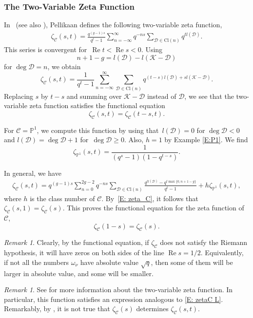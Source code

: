 \documentclass{amsart}
\renewcommand\Re{\operatorname*{Re}}	\renewcommand\Im{\operatorname*{Im}}
\renewcommand\P{\mathbb{P}}
\newcommand\Curve{\mathcal{C}}
\newcommand\calD{\mathcal{D}}	\newcommand\calK{\mathcal{K}}
\newcommand\Pic{\mathrm{Cl}}
\theoremstyle{definition}\newtheorem{definition}[theorem]{Definition}
\theoremstyle{remark}\newtheorem{remark}[theorem]{Remark}
\numberwithin{equation}{section}
\begin{document}
\subsubsection{The Two-Variable Zeta Function}
\label{S:two-variable}

In~\cite{Pell} (see also \cite{Expositiones}),
Pellikaan defines the following two-variable zeta function,
\begin{gather*}
\zeta_\Curve(s,t)=\frac{q^{(g-1)s}}{q^t-1}\sum_{n=-\infty}^\infty q^{-ns}\sum_{\calD\in\Pic(n)}q^{tl(\calD)}.
\end{gather*}
This series is convergent for~\mbox{$\Re t<\Re s<0$}.
Using
$$
n+1-g=l(\calD)-l(\calK-\calD)
$$
 for $\deg\calD=n$,
we obtain
$$
\zeta_\Curve(s,t)=\frac{1}{q^t-1}\sum_{n=-\infty}^\infty\sum_{\calD\in\Pic(n)}q^{(t-s)l(\calD)+sl(\calK-\calD)}.
$$
Replacing $s$ by $t-s$ and summing over $\calK-\calD$ instead of $\calD$,
we see that the two-variable zeta function satisfies the functional equation
$$
\zeta_\Curve(s,t)=\zeta_\Curve(t-s,t).
$$

For $\Curve=\P^1$,
we compute this function by using that~\mbox{$l(\calD)=0$} for $\deg\calD<0$ and $l(\calD)=\deg\calD+1$ for~\mbox{$\deg\calD\geq0$}.
Also,
 $h=1$ by Example \ref{E:P1}.
We find
$$
\zeta_{\P^1}(s,t)=\frac1{(q^s-1)(1-q^{t-s})}.
$$

In general,
we have
\begin{gather*}
\zeta_\Curve(s,t)=q^{(g-1)s}\sum_{n=0}^{2g-2}q^{-ns}
\sum_{\calD\in\Pic(n)}\frac{q^{tl(\calD)}-q^{t\max\{0,n+1-g\}}}{q^t-1}+h\zeta_{\P^1}(s,t),
\end{gather*}
where $h$ is the class number of $\Curve$.
By~\eqref{E: zeta_C},
it follows that $\zeta_\Curve(s,1)=\zeta_\Curve(s)$.
This proves the functional equation for the zeta function of $\Curve$,
$$
\zeta_\Curve(1-s)=\zeta_\Curve(s).
$$

\begin{remark}\label{R:symmetry}
Clearly,
by the functional equation,
if $\zeta_\Curve$ does not satisfy the Riemann hypothesis,
it will have zeros on both sides of the line $\Re s=1/2$.
Equivalently,
if not all the numbers $\omega_\nu$ have absolute value $\sqrt{q}$,
then some of them will be larger in absolute value,
and some will be smaller.
\end{remark}

\begin{remark}
See \cite{Expositiones} for more information about the two-variable zeta function.
In particular,
this function satisfies an expression analogous to \eqref{E: zetaC L}.
Remarkably,
by \cite[Example 4.4]{Pell},
it is not true that $\zeta_\Curve(s)$ determines $\zeta_\Curve(s,t)$.
\end{remark}
\end{document}
